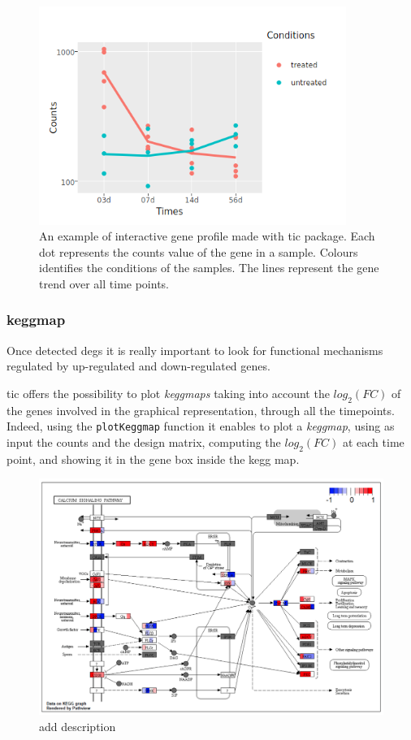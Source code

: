 \begin{figure}[H]
\centering
\includegraphics[width=10cm, keepaspectratio]{img/ticorser/gene_trend.png}
\caption[ticorser gene profile]{An example of interactive gene profile made with \gls{tic} package. Each dot represents the counts value of the gene in a sample. Colours identifies the conditions of the samples. The lines represent the gene trend over all time points.}
\label{fig:ticorsergenetrend}
\end{figure}


\subsubsection{keggmap}
Once detected \glspl{deg} it is really important to look for functional mechanisms regulated by up-regulated and down-regulated genes. 

\gls{tic} offers the possibility to plot \textit{keggmaps}\cite{Kanehisa2016} taking into account the $log_2(FC)$ of the genes involved in the graphical representation, through all the timepoints.
Indeed, using the \lstinline!plotKeggmap! function it enables to plot a \textit{keggmap}, using as input the counts and the design matrix, computing the $log_2(FC)$ at each time point, and showing it in the gene box inside the kegg map.

\begin{figure}[H]
\includegraphics[width=12cm, keepaspectratio]{img/ticorser/keggmap_example.png}
\caption[ticorser keggmap]{add description}
\label{fig:ticorserkeggmap}
\centering
\end{figure}








